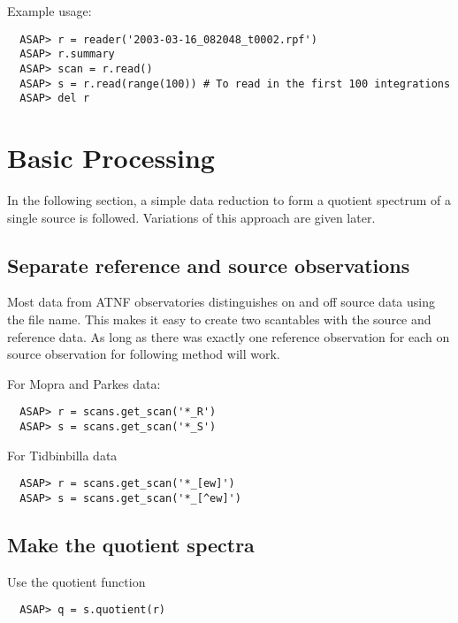 \documentclass[11pt]{article}
\begin{document}
Example usage:

\begin{verbatim}
  ASAP> r = reader('2003-03-16_082048_t0002.rpf')
  ASAP> r.summary 
  ASAP> scan = r.read()
  ASAP> s = r.read(range(100)) # To read in the first 100 integrations
  ASAP> del r
\end{verbatim}

\section{Basic Processing}

In the following section, a simple data reduction to form a quotient
spectrum of a single source is followed. Variations of this approach
are given later.



\subsection{Separate reference and source observations}

Most data from ATNF observatories distinguishes on and off source data
using the file name. This makes it easy to create two scantables with
the source and reference data. As long as there was exactly one
reference observation for each on source observation for following
method will work.

For Mopra and Parkes data:
\begin{verbatim}
  ASAP> r = scans.get_scan('*_R')
  ASAP> s = scans.get_scan('*_S')
\end{verbatim}

For Tidbinbilla data
\begin{verbatim}
  ASAP> r = scans.get_scan('*_[ew]')
  ASAP> s = scans.get_scan('*_[^ew]')
\end{verbatim}

\subsection{Make the quotient spectra}

Use the quotient function

\begin{verbatim}
  ASAP> q = s.quotient(r)
\end{verbatim}
\end{document}
